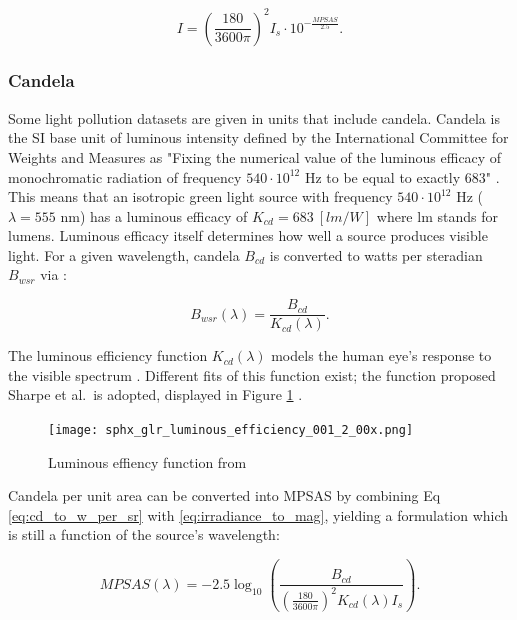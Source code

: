 \begin{equation} \label{eq:mpsas_to_irrad_per_ster}
  I = \left( \frac{180}{ 3600\pi} \right)^2 I_s \cdot 10^{-\frac{MPSAS}{2.5}}.
\end{equation}

\subsubsection{Candela} \label{sec:candela}

Some light pollution datasets are given in units that include candela. Candela is the SI base unit of luminous intensity defined by the International Committee for Weights and Measures as "Fixing the numerical value of the luminous efficacy of monochromatic radiation of frequency $540\cdot10^{12}$ Hz to be equal to exactly $683$" \cite{nist_units}. This means that an isotropic green light source with frequency $540\cdot10^{12}$ Hz ($\lambda = 555$ nm) has a luminous efficacy of $K_{cd} = 683 \: \left[ lm/W \right]$ where lm stands for lumens. Luminous efficacy itself determines how well a source produces visible light. For a given wavelength, candela $B_{cd}$ is converted to watts per steradian $B_{wsr}$ via \cite{nist_units}:

\begin{equation} \label{eq:cd_to_w_per_sr}
  B_{wsr}(\lambda) = \frac{B_{cd}}{K_{cd}(\lambda)}.
\end{equation}

The luminous efficiency function $K_{cd}(\lambda)$ models the human eye's response to the visible spectrum \cite{sharpe2005}. Different fits of this function exist; the function proposed Sharpe et al.\ is adopted, displayed in Figure \ref{fig:luminous_efficiency} \cite{sharpe2005}.

\begin{figure}[ht]
  \centering
  \texttt{[image: sphx\_glr\_luminous\_efficiency\_001\_2\_00x.png]}
  \caption{Luminous effiency function from \cite{sharpe2005}}
  \label{fig:luminous_efficiency}
\end{figure}

Candela per unit area can be converted into MPSAS by combining Eq \ref{eq:cd_to_w_per_sr} with \ref{eq:irradiance_to_mag}, yielding a formulation which is still a function of the source's wavelength:

\begin{equation} \label{eq:cd_per_m2_to_mpsas}
  MPSAS(\lambda) = -2.5 \log_{10}\left( \frac{B_{cd}}{\left( \frac{180}{ 3600\pi} \right)^2 K_{cd}(\lambda) I_s} \right).
\end{equation}

